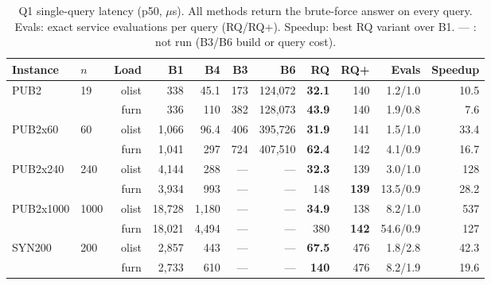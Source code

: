 \begin{table}[t]
\centering\small
\setlength{\tabcolsep}{2.6pt}
\caption{Q1 single-query latency (p50, $\mu$s). All methods return the brute-force answer on every query. Evals: exact service evaluations per query (RQ/RQ+). Speedup: best RQ variant over B1. --- : not run (B3/B6 build or query cost).}
\label{tab:q1}
\begin{tabular}{@{}llrrrrrrrrr@{}}
\toprule
Instance & $n$ & Load & B1 & B4 & B3 & B6 & RQ & RQ+ & Evals & Speedup\\
\midrule
PUB2 & 19 & olist & 338 & 45.1 & 173 & 124{,}072 & \textbf{32.1} & 140 & 1.2/1.0 & 10.5\\
 &  & furn & 336 & 110 & 382 & 128{,}073 & \textbf{43.9} & 140 & 1.9/0.8 & 7.6\\
\midrule
PUB2x60 & 60 & olist & 1{,}066 & 96.4 & 406 & 395{,}726 & \textbf{31.9} & 141 & 1.5/1.0 & 33.4\\
 &  & furn & 1{,}041 & 297 & 724 & 407{,}510 & \textbf{62.4} & 142 & 4.1/0.9 & 16.7\\
\midrule
PUB2x240 & 240 & olist & 4{,}144 & 288 & --- & --- & \textbf{32.3} & 139 & 3.0/1.0 & 128\\
 &  & furn & 3{,}934 & 993 & --- & --- & 148 & \textbf{139} & 13.5/0.9 & 28.2\\
\midrule
PUB2x1000 & 1000 & olist & 18{,}728 & 1{,}180 & --- & --- & \textbf{34.9} & 138 & 8.2/1.0 & 537\\
 &  & furn & 18{,}021 & 4{,}494 & --- & --- & 380 & \textbf{142} & 54.6/0.9 & 127\\
\midrule
SYN200 & 200 & olist & 2{,}857 & 443 & --- & --- & \textbf{67.5} & 476 & 1.8/2.8 & 42.3\\
 &  & furn & 2{,}733 & 610 & --- & --- & \textbf{140} & 476 & 8.2/1.9 & 19.6\\
\bottomrule
\end{tabular}
\end{table}
